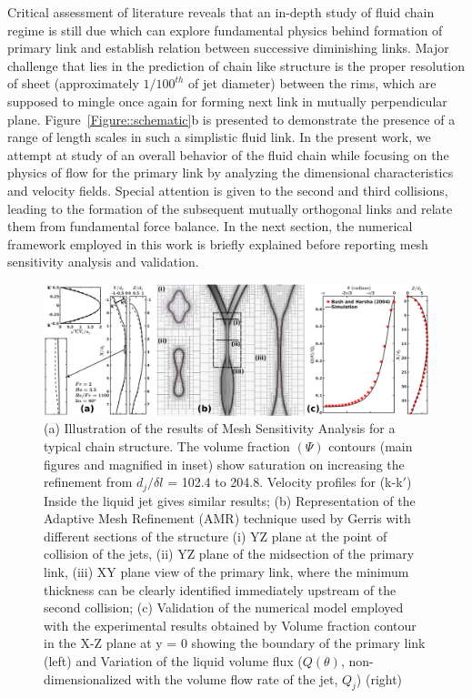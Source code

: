 \documentclass{jfm}
\begin{document}
Critical assessment of literature reveals that an in-depth study of fluid chain regime is still due which can explore fundamental physics behind formation of primary link and establish relation between successive diminishing links. Major challenge that lies in the prediction of chain like structure is the proper resolution of sheet (approximately $1/100^{th}$ of jet diameter) between the rims, which are supposed to mingle once again for forming next link in mutually perpendicular plane. Figure~\ref{Figure::schematic}b is presented to demonstrate the presence of a range of length scales in such a simplistic fluid link. In the present work, we attempt at study of an overall behavior of the fluid chain  while focusing on the physics of flow for the primary link by analyzing the dimensional characteristics and velocity fields. Special attention is given to the second and third collisions, leading to the formation of the subsequent mutually orthogonal links and relate them from fundamental force balance. In the next section, the numerical framework employed in this work is briefly explained before reporting mesh sensitivity analysis and validation.
\begin{figure}
	\centering
	\includegraphics[width=\linewidth]{Figure2}
	\caption{(a) Illustration of the results of Mesh Sensitivity Analysis for a typical chain structure. The volume fraction $\left(\Psi\right)$ contours (main figures and magnified in inset) show saturation on increasing the refinement from $d_j/\delta l$ = 102.4 to 204.8. Velocity profiles for (k-k$'$) Inside the liquid jet gives similar results; (b) Representation of the Adaptive Mesh Refinement (AMR) technique used by Gerris with different sections of the structure (i) YZ plane at the point of collision of the jets, (ii) YZ plane of the midsection of the primary link, (iii) XY plane view of the primary link, where the minimum thickness can be clearly identified immediately upstream of the second collision; (c) Validation of the numerical model employed with the experimental results obtained by \cite{bush2004collision} Volume fraction contour in the X-Z plane at y = 0 showing the boundary of the primary link (left) and Variation of the liquid volume flux ($Q(\theta)$, non-dimensionalized with the volume flow rate of the jet, $Q_j$) (right)}
	\label{Figure::gisetal}
\end{figure}
\end{document}
